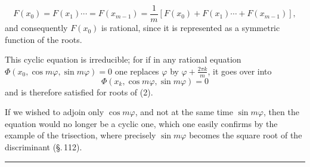 \[
F(x_0) = F(x_1) \cdots = F(x_{m-1}) = \frac{1}{m}\left[F(x_0) + F(x_1) \cdots + F(x_{m-1})\right],
\]
and consequently $F(x_0)$ is rational, since it is represented as a symmetric function of the roots.


This cyclic equation is irreducible; for if in any rational equation $\Phi(x_0, \cos m\varphi, \sin m\varphi) = 0$ one replaces $\varphi$ by $\varphi + \frac{2\pi k}{m}$, it goes over into
\[
\Phi(x_k, \cos m\varphi, \sin m\varphi) = 0
\]
and is therefore satisfied for  roots of (2).

If we wished to adjoin only $\cos m\varphi$, and not at the same time $\sin m\varphi$, then the equation would no longer be a cyclic one, which one easily confirms by the example of the trisection, where precisely $\sin m\varphi$ becomes the square root of the discriminant (\S.\,112).

\begin{center}
\rule{3cm}{0.4pt}
\end{center}

